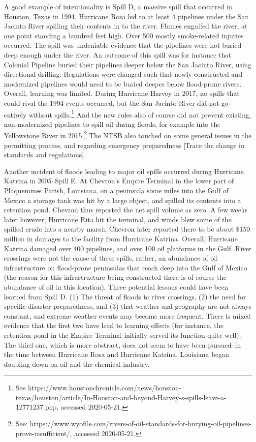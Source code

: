 \documentclass[12pt, man, natbib]{apa6}
\begin{document}
	A good example of intentionality is Spill D, a massive spill that occurred in Houston, Texas in 1994. Hurricane Rosa led to at least 4 pipelines under the San Jacinto River spilling their contents in to the river. Flames engulfed the river, at one point standing a hundred feet high. Over 500 mostly smoke-related injuries occurred. The spill was undeniable evidence that the pipelines were not buried deep enough under the river. An outcome of this spill was for instance that Colonial Pipeline buried their pipelines deeper below the San Jacinto River, using directional drilling. Regulations were changed such that newly constructed and modernized pipelines would need to be buried deeper below flood-prone rivers. Overall, learning was limited. During Hurricane Harvey in 2017, no spills that could rival the 1994 events occurred, but the San Jacinto River did not go entirely without spills.\footnote{See https://www.houstonchronicle.com/news/houston-texas/houston/article/In-Houston-and-beyond-Harvey-s-spills-leave-a-12771237.php, accessed 2020-05-21.} And the new rules also of course did not prevent existing, non-modernized pipelines to spill oil during floods, for example into the Yellowstone River in 2015.\footnote{See: https://www.wyofile.com/rivers-of-oil-standards-for-burying-oil-pipelines-prove-insufficient/, accessed 2020-05-21.} The NTSB also touched on some general issues in the permitting process, and regarding emergency preparedness [Trace the change in standards and regulations].
	
	Another incident of floods leading to major oil spills occurred during Hurricane Katrina in 2005--Spill E. At Chevron's Empire Terminal in the lower part of Plaquemines Parish, Louisiana, on a peninsula some miles into the Gulf of Mexico a storage tank was hit by a large object, and spilled its contents into a retention pond. Chevron thus reported the net spill volume as zero. A few weeks later however, Hurricane Rita hit the terminal, and winds blew some of the spilled crude into a nearby marsh. Chevron later reported there to be about \$150 million in damages to the facility from Hurricane Katrina. Overall, Hurricane Katrina damaged over 400 pipelines, and over 100 oil platforms in the Gulf. River crossings were not the cause of these spills, rather, an abundance of oil infrastructure on flood-prone peninsulas that reach deep into the Gulf of Mexico (the reason for this infrastructure being constructed there is of course the abundance of oil in this location). Three potential lessons could have been learned from Spill D. (1) The threat of floods to river crossings, (2) the need for specific disaster preparedness, and (3) that weather and geography are not always constant, and extreme weather events may become more frequent. There is mixed evidence that the first two have lead to learning effects (for instance, the retention pond in the Empire Terminal initially served its function quite well). The third one, which is more abstract, does not seem to have been pursued--in the time between Hurricane Rosa and Hurricane Katrina, Louisiana began doubling down on oil and the chemical industry.


\end{document}
